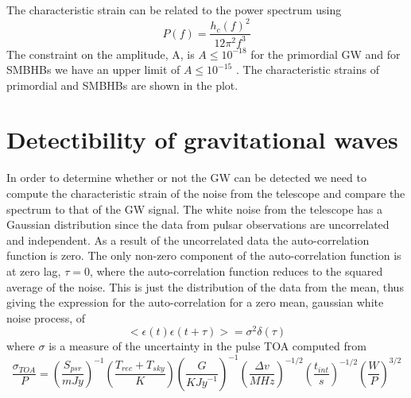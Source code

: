 \documentclass[12pt]{article}
\begin{document}
	The characteristic strain can be related to the power spectrum using 
	\begin{equation}\label{power spec}
	P(f)=\frac{h_{c}(f)^2}{12 \pi^2 f^3}
	\end{equation}
	The constraint on the amplitude, A, is $A \leq 10^{-18}$ \cite{zhao2013constraints} for the primordial GW and for SMBHBs we have an upper limit of $A \leq 10^{-15}$ \cite{arzoumanian2016nanograv}. The characteristic strains of primordial and SMBHBs are shown in the plot. 
	
	\section{Detectibility of gravitational waves} \label{Detectibility of gws}
	In order to determine whether or not the GW can be detected we need to compute the characteristic strain of the noise from the telescope and compare the spectrum to that of the GW signal. The white noise from the telescope has a Gaussian distribution since the data from pulsar observations are uncorrelated and independent. As a result of the uncorrelated data the auto-correlation function is zero. The only non-zero component of the auto-correlation function is at zero lag, $\tau=0$, where the auto-correlation function reduces to the squared average of the noise. This is just the distribution of the data from the mean, thus giving the expression for the auto-correlation for a zero mean, gaussian white noise process, of 
	\begin{equation}\label{auto-correlation of white noise}
	<\epsilon(t)\epsilon(t+\tau)>=\sigma^2 \delta(\tau)
	\end{equation}
	where $\sigma$ is a measure of the uncertainty in the pulse TOA computed from \cite{lorimer2008binary} \\ %
	\begin{equation} \label{uncertainty in toa}
	\frac{\sigma_{TOA}}{P}=(\frac{S_{psr}}{mJy})^{-1}(\frac{T_{rec}+T_{sky}}{K})(\frac{G}{K{Jy}^{-1}})^{-1}(\frac{\Delta{v}}{MHz})^{-1/2}(\frac{t_{int}}{s})^{-1/2}(\frac{W}{P})^{3/2}
	\end{equation}
	
\end{document}

